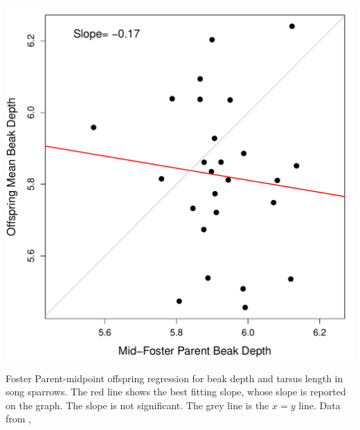  \begin{marginfigure}
\begin{center}
\includegraphics[width=\textwidth]{Journal_figs/Quant_gen/song_sparrow_herit/song_sparrow_herit_foster.pdf}
\end{center}
\caption{Foster Parent-midpoint offspring regression for beak depth and
  tarsus length in song sparrows. The red line shows the best fitting
  slope, whose slope is reported on the graph. The slope is not significant. The grey line is the
  $x=y$ line. Data from \citet{smith1980experimental},
  } \label{fig:song_sparrow_herit_foster}
\end{marginfigure}


